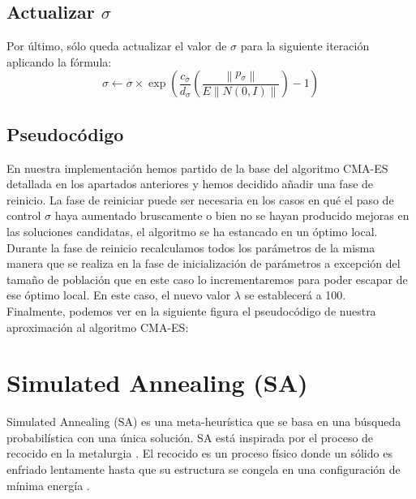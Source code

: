 \subsection{Actualizar $ \sigma $}
Por último, sólo queda actualizar el valor de $\sigma$ para la siguiente iteración aplicando la fórmula:  
\begin{equation} \label{eq:6}
     \sigma\leftarrow\sigma \times \exp(\frac{c_{\sigma}}{d_{\sigma}} (\frac{\left \| p_{\sigma}\right\|}{E \left \|N(0, I)\right \|}) - 1)
\end{equation}

\subsection{Pseudocódigo}

En nuestra implementación hemos partido de la base del algoritmo CMA-ES detallada en los apartados anteriores y hemos decidido añadir una fase de reinicio. La fase de reiniciar puede ser necesaria en los casos en qué el paso de control $\sigma$ haya aumentado bruscamente o bien no se hayan producido mejoras en las soluciones candidatas, el algoritmo se ha estancado en un óptimo local. \\

Durante la fase de reinicio recalculamos todos los parámetros de la misma manera que se realiza en la fase de inicialización de parámetros a excepción del tamaño de población que en este caso lo incrementaremos para poder escapar de ese óptimo local. En este caso, el nuevo valor $\lambda$ se establecerá a 100. \\

Finalmente, podemos ver en la siguiente figura el pseudocódigo de nuestra aproximación al algoritmo CMA-ES:


\section{Simulated Annealing (SA)}
\label{sec:SA}

Simulated Annealing (SA) \cite{SA1, SA2, SA3} es una meta-heurística que se basa en una búsqueda probabilística con una única solución. SA está inspirada por el proceso de recocido en la metalurgia \cite{metabook}. El recocido es un proceso físico donde un sólido es enfriado lentamente hasta que su estructura se congela en una configuración de mínima energía \cite{metabook}.

